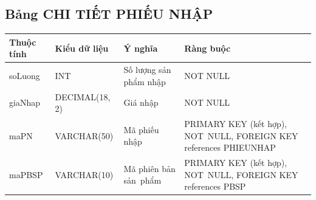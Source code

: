 \documentclass[a4paper,12pt]{report}
\begin{document}
\subsection{Bảng CHI TIẾT PHIẾU NHẬP}
\noindent
\begin{center}
    \begin{longtable}{|>{\centering\arraybackslash}p{3cm}|
        >{\centering\arraybackslash}p{4cm}|
        >{\centering\arraybackslash}p{4cm}|
        >{\centering\arraybackslash}p{4cm}|}
        \hline
        \textbf{Thuộc tính}                                                                                                               &
        \textbf{Kiểu dữ liệu}                                                                                                                             &
        \textbf{Ý nghĩa}                                                                                                 &
        \textbf{Ràng buộc}                                                                                                         \\
        \hline
        soLuong &  INT  & Số lượng sản phẩm nhập & NOT NULL \\
        \hline
        giaNhap &  DECIMAL(18, 2)  & Giá nhập & NOT NULL \\                                                                                                                          
        \hline
        maPN & VARCHAR(50) & Mã phiếu nhập & PRIMARY KEY (kết hợp), NOT~NULL, FOREIGN KEY references PHIEUNHAP \\                                                                                                                          
        \hline
        maPBSP &  VARCHAR(10)  & Mã phiên bản sản~phẩm & PRIMARY KEY (kết hợp), NOT~NULL, FOREIGN KEY references PBSP \\
        \hline
    \end{longtable}
\end{center}
\end{document}
